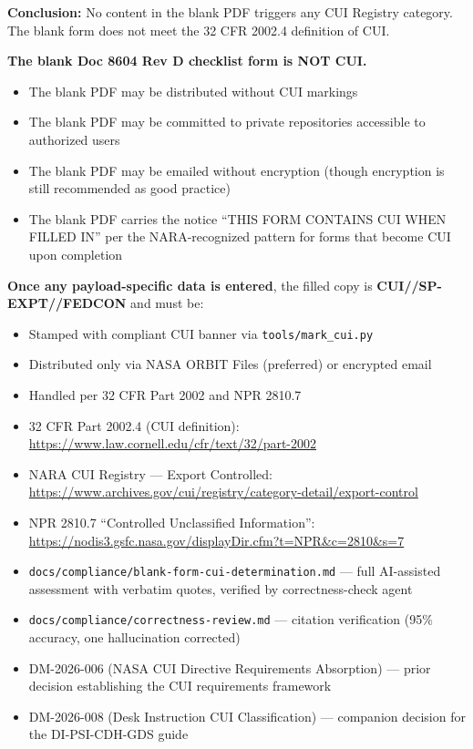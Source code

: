 {\begin{enumerate}
\textbf{Conclusion:} No content in the blank PDF triggers any CUI Registry category. The blank form does not meet the 32 CFR 2002.4 definition of CUI.


\textbf{The blank Doc 8604 Rev D checklist form is NOT CUI.}

\begin{itemize}
    \item The blank PDF may be distributed without CUI markings
    \item The blank PDF may be committed to private repositories accessible to authorized users
    \item The blank PDF may be emailed without encryption (though encryption is still recommended as good practice)
    \item The blank PDF carries the notice ``THIS FORM CONTAINS CUI WHEN FILLED IN'' per the NARA-recognized pattern for forms that become CUI upon completion
\end{itemize}

\textbf{Once any payload-specific data is entered}, the filled copy is \textbf{CUI//SP-EXPT//FEDCON} and must be:
\begin{itemize}
    \item Stamped with compliant CUI banner via \texttt{tools/mark\_cui.py}
    \item Distributed only via NASA ORBIT Files (preferred) or encrypted email
    \item Handled per 32 CFR Part 2002 and NPR 2810.7
\end{itemize}


\begin{itemize}
    \item 32 CFR Part 2002.4 (CUI definition): \url{https://www.law.cornell.edu/cfr/text/32/part-2002}
    \item NARA CUI Registry --- Export Controlled: \url{https://www.archives.gov/cui/registry/category-detail/export-control}
    \item NPR 2810.7 ``Controlled Unclassified Information'': \url{https://nodis3.gsfc.nasa.gov/displayDir.cfm?t=NPR&c=2810&s=7}
    \item \texttt{docs/compliance/blank-form-cui-determination.md} --- full AI-assisted assessment with verbatim quotes, verified by correctness-check agent
    \item \texttt{docs/compliance/correctness-review.md} --- citation verification (95\% accuracy, one hallucination corrected)
    \item DM-2026-006 (NASA CUI Directive Requirements Absorption) --- prior decision establishing the CUI requirements framework
    \item DM-2026-008 (Desk Instruction CUI Classification) --- companion decision for the DI-PSI-CDH-GDS guide
\end{itemize}

\end{enumerate}
}


